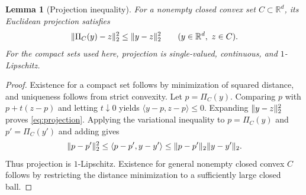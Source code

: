 \documentclass[11pt]{article}
\numberwithin{equation}{section}
\newtheorem{lemma}[lemma]{Lemma}
\theoremstyle{definition}
\theoremstyle{remark}
\newcommand{\R}{\mathbb R}
\DeclarePairedDelimiter{\norm}{\lVert}{\rVert}
\newcommand{\ip}[2]{\langle #1,#2\rangle}
\begin{document}
\begin{lemma}[Projection inequality]\label{lem:projection}
For a nonempty closed convex set $C\subset\R^d$, its Euclidean projection satisfies
\begin{equation}\label{eq:projection}
\norm{\Pi_C(y)-z}_2^2\le\norm{y-z}_2^2
\qquad(y\in\R^d,\ z\in C).
\end{equation}
For the compact sets used here, projection is single-valued, continuous, and $1$-Lipschitz.
\end{lemma}
\begin{proof}
Existence for a compact set follows by minimization of squared distance, and uniqueness follows from strict convexity. Let $p=\Pi_C(y)$. Comparing $p$ with $p+t(z-p)$ and letting $t\downarrow0$ yields $\ip{y-p}{z-p}\le0$. Expanding $\norm{y-z}_2^2$ proves \eqref{eq:projection}. Applying the variational inequality to $p=\Pi_C(y)$ and $p'=\Pi_C(y')$ and adding gives
\[
\norm{p-p'}_2^2\le\ip{p-p'}{y-y'}\le\norm{p-p'}_2\norm{y-y'}_2.
\]
Thus projection is $1$-Lipschitz. Existence for general nonempty closed convex $C$ follows by restricting the distance minimization to a sufficiently large closed ball.
\end{proof}
\end{document}
